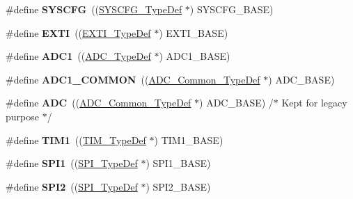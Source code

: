 \begin{DoxyCompactItemize}
\#define {\bfseries S\+Y\+S\+C\+FG}~((\hyperlink{struct_s_y_s_c_f_g___type_def}{S\+Y\+S\+C\+F\+G\+\_\+\+Type\+Def} $\ast$) S\+Y\+S\+C\+F\+G\+\_\+\+B\+A\+SE)
\item 
\mbox{\label{group___peripheral__declaration_ga9189e770cd9b63dadd36683eb9843cac}} 
\#define {\bfseries E\+X\+TI}~((\hyperlink{struct_e_x_t_i___type_def}{E\+X\+T\+I\+\_\+\+Type\+Def} $\ast$) E\+X\+T\+I\+\_\+\+B\+A\+SE)
\item 
\mbox{\label{group___peripheral__declaration_ga90d2d5c526ce5c0a551f533eccbee71a}} 
\#define {\bfseries A\+D\+C1}~((\hyperlink{struct_a_d_c___type_def}{A\+D\+C\+\_\+\+Type\+Def} $\ast$) A\+D\+C1\+\_\+\+B\+A\+SE)
\item 
\mbox{\label{group___peripheral__declaration_gaf1919c64fc774aab31190346fd5457e2}} 
\#define {\bfseries A\+D\+C1\+\_\+\+C\+O\+M\+M\+ON}~((\hyperlink{struct_a_d_c___common___type_def}{A\+D\+C\+\_\+\+Common\+\_\+\+Type\+Def} $\ast$) A\+D\+C\+\_\+\+B\+A\+SE)
\item 
\mbox{\label{group___peripheral__declaration_ga54d148b91f3d356713f7e367a2243bea}} 
\#define {\bfseries A\+DC}~((\hyperlink{struct_a_d_c___common___type_def}{A\+D\+C\+\_\+\+Common\+\_\+\+Type\+Def} $\ast$) A\+D\+C\+\_\+\+B\+A\+SE) /$\ast$ Kept for legacy purpose $\ast$/
\item 
\mbox{\label{group___peripheral__declaration_ga2e87451fea8dc9380056d3cfc5ed81fb}} 
\#define {\bfseries T\+I\+M1}~((\hyperlink{struct_t_i_m___type_def}{T\+I\+M\+\_\+\+Type\+Def} $\ast$) T\+I\+M1\+\_\+\+B\+A\+SE)
\item 
\mbox{\label{group___peripheral__declaration_gad483be344a28ac800be8f03654a9612f}} 
\#define {\bfseries S\+P\+I1}~((\hyperlink{struct_s_p_i___type_def}{S\+P\+I\+\_\+\+Type\+Def} $\ast$) S\+P\+I1\+\_\+\+B\+A\+SE)
\item 
\mbox{\label{group___peripheral__declaration_gaf2c3d8ce359dcfbb2261e07ed42af72b}} 
\#define {\bfseries S\+P\+I2}~((\hyperlink{struct_s_p_i___type_def}{S\+P\+I\+\_\+\+Type\+Def} $\ast$) S\+P\+I2\+\_\+\+B\+A\+SE)

\end{DoxyCompactItemize}
